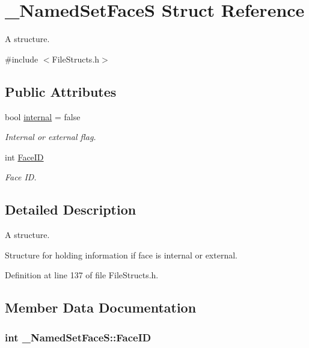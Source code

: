 \hypertarget{struct___named_set_face_s}{}\section{\+\_\+\+Named\+Set\+FaceS Struct Reference}
\label{struct___named_set_face_s}


A structure.  




{\ttfamily \#include $<$File\+Structs.\+h$>$}

\subsection*{Public Attributes}
\begin{DoxyCompactItemize}
\item 
bool \hyperlink{struct___named_set_face_s_ad89d075c31bb09b5d09a4f0ef1bcf3b1}{internal} = false
\begin{DoxyCompactList}\small\item\em Internal or external flag. \end{DoxyCompactList}\item 
int \hyperlink{struct___named_set_face_s_a39ab2efe31bd47d3b506c59fb9816911}{Face\+ID}
\begin{DoxyCompactList}\small\item\em Face ID. \end{DoxyCompactList}\end{DoxyCompactItemize}


\subsection{Detailed Description}
A structure. 

Structure for holding information if face is internal or external. 

Definition at line 137 of file File\+Structs.\+h.



\subsection{Member Data Documentation}
\subsubsection[{\texorpdfstring{Face\+ID}{FaceID}}]{\setlength{\rightskip}{0pt plus 5cm}int \+\_\+\+Named\+Set\+Face\+S\+::\+Face\+ID}\hypertarget{struct___named_set_face_s_a39ab2efe31bd47d3b506c59fb9816911}{}\label{struct___named_set_face_s_a39ab2efe31bd47d3b506c59fb9816911}


